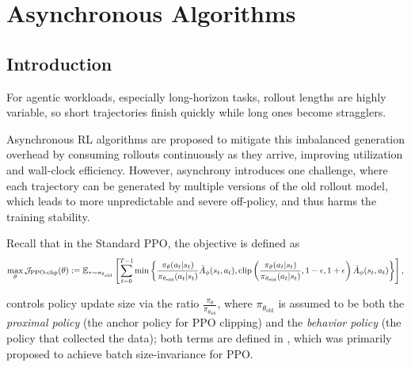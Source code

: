 \section{Asynchronous Algorithms}
\subsection{Introduction}

For agentic workloads, especially long-horizon tasks, rollout lengths are highly variable, so short trajectories finish quickly while long ones become stragglers.

Asynchronous RL algorithms are proposed to mitigate this imbalanced generation overhead by consuming rollouts continuously as they arrive, improving utilization and wall-clock efficiency. However, asynchrony introduces one challenge, where each trajectory can be generated by multiple versions of the old rollout model, which leads to more unpredictable and severe off-policy, and thus harms the training stability.

Recall that in the Standard PPO, the objective is defined as
\begin{align*}
     \max_{\theta} {\cal J}_{\text{PPO-clip}}(\theta):= \mathbb{E}_{\tau\sim \pi_{\theta_{\text{old}}}}\left[ \sum_{t=0}^{T-1}  \min\left\{\frac{\pi_{\theta}(a_t|s_t)}{\pi_{\theta_{\text{old}}}(a_t|s_t)}\hat A_\phi(s_t,a_t), \operatorname{clip}\left(\frac{\pi_{\theta}(a_t|s_t)}{\pi_{\theta_{\text{old}}}(a_t|s_t)}, 1-\epsilon, 1+\epsilon\right)\hat A_\phi(s_t,a_t)\right\}\right],
\end{align*}

controls policy update size via the ratio $\frac{\pi_{\theta}}{\pi_{\theta_{\text{old}}}}$, where $\pi_{\theta_{\text{old}}}$ is assumed to be both the \textit{proximal policy} (the anchor policy for PPO clipping) and the \textit{behavior policy} (the policy that collected the data); both terms are defined in \citep{hilton2022batchsizeinvariancepolicyoptimization}, which was primarily proposed to achieve batch size-invariance for PPO.

